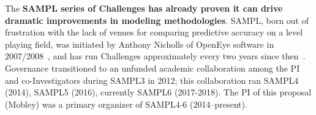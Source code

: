 \documentclass[11pt]{article}
\begin{document}
The {\bf SAMPL series of Challenges has already proven it can drive dramatic improvements in modeling methodologies}.
SAMPL, born out of frustration with the lack of venues for comparing predictive accuracy on a level playing field, was initiated by Anthony Nicholls of OpenEye software in 2007/2008~\cite{nicholls_predicting_2008}, and has run Challenges approximately every two years since then~\cite{nicholls_samp1_2009, mobley_predictions_2009, geballe_sampl2_2010, geballe_sampl3_2012, mobley_blind_2014-1, muddana_sampl4_2014, Bannan:2016:JComputAidedMolDes, yin_overview_2016}.
Governance transitioned to an unfunded academic collaboration among the PI and co-Investigators during SAMPL3 in 2012; this collaboration ran SAMPL4 (2014), SAMPL5 (2016), currently SAMPL6 (2017-2018). 
The PI of this proposal (Mobley) was a primary organizer of SAMPL4-6 (2014--present).
\end{document}
